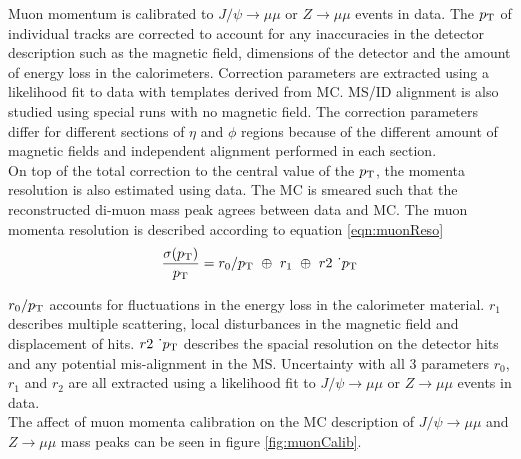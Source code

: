 \indent Muon momentum is calibrated to $J/\psi\rightarrow \mu\mu$ or $Z\rightarrow\mu\mu$ events in data.  The $p_{\mathrm{T}}$ of individual tracks are corrected to account for any inaccuracies in the detector description such as the magnetic field, dimensions of the detector and the amount of energy loss in the calorimeters.  Correction parameters are extracted using a likelihood fit to data with templates derived from MC. MS/ID alignment is also studied using special runs with no magnetic field. The correction parameters differ for different sections of $\eta$ and $\phi$ regions because of the different amount of magnetic fields and independent alignment performed in each section. \\

\indent On top of the total correction to the central value of the $p_{\mathrm{T}}$, the momenta resolution is also estimated using data.  The MC is smeared such that the reconstructed di-muon mass peak agrees between data and MC.  The muon momenta resolution is described according to equation \ref{eqn:muonReso}\\

\begin{equation}
\frac{\sigma(p_{\mathrm{T}})}{p_{\mathrm{T}}} = r_0/p_{\mathrm{T}}~\oplus~r_1~\oplus~r2~\dot~p_{\mathrm{T}}
\label{eqn:muonReso}
\end{equation}

\indent $r_0/p_{\mathrm{T}}$ accounts for fluctuations in the energy loss in the calorimeter material.  $r_1$ describes multiple scattering, local disturbances in the magnetic field and displacement of hits.  $r2~\dot~p_{\mathrm{T}}$ describes the spacial resolution on the detector hits and any potential mis-alignment in the MS.  Uncertainty with all 3 parameters $r_0$, $r_1$ and $r_2$ are all extracted using a likelihood fit to $J/\psi\rightarrow \mu\mu$ or $Z\rightarrow\mu\mu$ events in data. \\

The affect of muon momenta calibration on the MC description of $J/\psi\rightarrow \mu\mu$ and $Z\rightarrow\mu\mu$ mass peaks can be seen in figure \ref{fig:muonCalib}. \\

